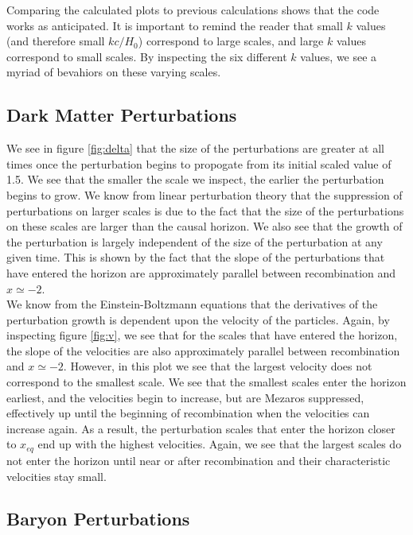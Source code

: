 \documentclass[a4paper]{article}
\begin{document}
Comparing the calculated plots to previous calculations shows that the code works as anticipated. It is important to remind the reader that small $k$ values (and therefore small $kc/H_0$) correspond to large scales, and large $k$ values correspond to small scales. By inspecting the six different $k$ values, we see a myriad of bevahiors on these varying scales. 

\subsection{Dark Matter Perturbations} 

We see in figure \ref{fig:delta} that the size of the perturbations are greater at all times once the perturbation begins to propogate from its initial scaled value of 1.5. We see that the smaller the scale we inspect, the earlier the perturbation begins to grow. We know from linear perturbation theory that the suppression of perturbations on larger scales is due to the fact that the size of the perturbations on these scales are larger than the causal horizon. We also see that the growth of the perturbation is largely independent of the size of the perturbation at any given time. This is shown by the fact that the slope of the perturbations that have entered the horizon are approximately parallel between recombination and $x \simeq -2$.\\

We know from the Einstein-Boltzmann equations that the derivatives of the perturbation growth is dependent upon the velocity of the particles. Again, by inspecting figure \ref{fig:v}, we see that for the scales that have entered the horizon, the slope of the velocities are also approximately parallel between recombination and $x \simeq -2.$ However, in this plot we see that the largest velocity does not correspond to the smallest scale. We see that the smallest scales enter the horizon earliest, and the velocities begin to increase, but are Mezaros suppressed, effectively up until the beginning of recombination when the velocities can increase again. As a result, the perturbation scales that enter the horizon closer to $x_{eq}$ end up with the highest velocities. Again, we see that the largest scales do not enter the horizon until near or after recombination and their characteristic velocities stay small. \\

\subsection{Baryon Perturbations}
\end{document}

